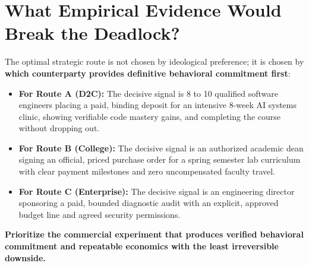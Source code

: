 \section{What Empirical Evidence Would Break the Deadlock?}

The optimal strategic route is not chosen by ideological preference; it is chosen by \textbf{which counterparty provides definitive behavioral commitment first}:

\begin{itemize}[leftmargin=12pt,itemsep=2pt,topsep=1pt]
  \item \textbf{For Route A (D2C):} The decisive signal is 8 to 10 qualified software engineers placing a paid, binding deposit for an intensive 8-week AI systems clinic, showing verifiable code mastery gains, and completing the course without dropping out.
  \item \textbf{For Route B (College):} The decisive signal is an authorized academic dean signing an official, priced purchase order for a spring semester lab curriculum with clear payment milestones and zero uncompensated faculty travel.
  \item \textbf{For Route C (Enterprise):} The decisive signal is an engineering director sponsoring a paid, bounded diagnostic audit with an explicit, approved budget line and agreed security permissions.
\end{itemize}

\textbf{Prioritize the commercial experiment that produces verified behavioral commitment and repeatable economics with the least irreversible downside.}
